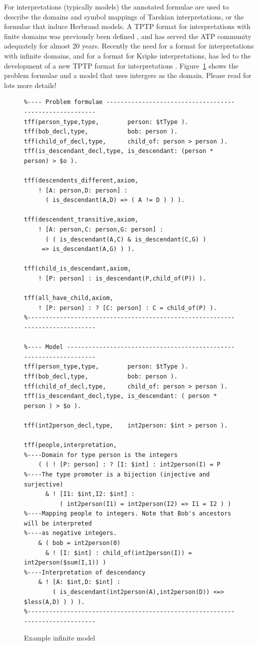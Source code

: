 \documentclass{easychair}
\begin{document}
For interpretations (typically models) the annotated formulae are used to describe the domains
and symbol mappings of Tarskian interpretations, or the formulae that induce Herbrand models.
A TPTP format for interpretations with finite domains was previously been defined \cite{SS+06}, 
and has served the ATP community adequately for almost 20 years. 
Recently the need for a format for interpretations with infinite domains, and for a format for 
Kripke interpretations, has led to the development of a new TPTP format for interpretations
\cite{SSP24}.
Figure~\ref{ExampleModel} shows the problem formulae and a model that uses intergers as the domain.
Please read \cite{SSP24} for lots more details!

\begin{figure}[htb]
{\footnotesize
{\setlength{\baselineskip}{3mm}
\begin{verbatim}
%---- Problem formulae --------------------------------------------------------
tff(person_type,type,        person: $tType ).
tff(bob_decl,type,           bob: person ).
tff(child_of_decl,type,      child_of: person > person ).
tff(is_descendant_decl,type, is_descendant: (person * person) > $o ).

tff(descendents_different,axiom,
    ! [A: person,D: person] : 
      ( is_descendant(A,D) => ( A != D ) ) ).

tff(descendent_transitive,axiom,
    ! [A: person,C: person,G: person] :
      ( ( is_descendant(A,C) & is_descendant(C,G) ) 
     => is_descendant(A,G) ) ).

tff(child_is_descendant,axiom,
    ! [P: person] : is_descendant(P,child_of(P)) ).

tff(all_have_child,axiom,
    ! [P: person] : ? [C: person] : C = child_of(P) ).
%------------------------------------------------------------------------------

%---- Model -------------------------------------------------------------------
tff(person_type,type,        person: $tType ).
tff(bob_decl,type,           bob: person ).
tff(child_of_decl,type,      child_of: person > person ).
tff(is_descendant_decl,type, is_descendant: ( person * person ) > $o ).

tff(int2person_decl,type,    int2person: $int > person ).

tff(people,interpretation,
%----Domain for type person is the integers
    ( ( ! [P: person] : ? [I: $int] : int2person(I) = P
%----The type promoter is a bijection (injective and surjective)
      & ! [I1: $int,I2: $int] : 
          ( int2person(I1) = int2person(I2) => I1 = I2 ) )
%----Mapping people to integers. Note that Bob's ancestors will be interpreted 
%----as negative integers.
    & ( bob = int2person(0)
      & ! [I: $int] : child_of(int2person(I)) = int2person($sum(I,1)) )
%----Interpretation of descendancy
    & ! [A: $int,D: $int] : 
        ( is_descendant(int2person(A),int2person(D)) <=> $less(A,D) ) ) ).
%------------------------------------------------------------------------------
\end{verbatim}
}}
\caption{Example infinite model}
\label{ExampleModel}
\end{figure}
\end{document}

